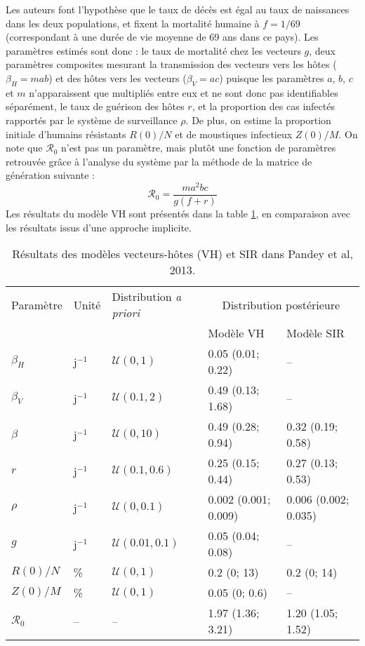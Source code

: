 Les auteurs font l'hypothèse que le taux de décès est égal au taux de naissances dans les deux populations, et fixent la mortalité humaine à $f=1/69$ (correspondant à une durée de vie moyenne de 69 ans dans ce pays).
Les paramètres estimés sont donc : le taux de mortalité chez les vecteurs $g$, deux paramètres composites mesurant la transmission des vecteurs vers les hôtes ($\beta_H=mab$) et des hôtes vers les vecteurs ($\beta_V=ac$) puisque les paramètres $a$, $b$, $c$ et $m$ n'apparaissent que multipliés entre eux et ne sont donc pas identifiables séparément, le taux de guérison des hôtes $r$, et la proportion des cas infectés rapportés par le système de surveillance $\rho$.
De plus, on estime la proportion initiale d'humains résistants $R(0)/N$ et de moustiques infectieux $Z(0)/M$.
On note que $\mathcal{R}_0$ n'est pas un paramètre, mais plutôt une fonction de paramètres retrouvée grâce à l'analyse du système par la méthode de la matrice de génération suivante :
\begin{equation}
\mathcal{R}_0 = \frac{ma^2bc}{g(f+r)}
\end{equation}
Les résultats du modèle VH sont présentés dans la table \ref{table:pandeyres}, en comparaison avec les résultats issus d'une approche implicite.

\begin{table}[h]
\centering
\caption{Résultats des modèles vecteurs-hôtes (VH) et SIR dans Pandey et al, 2013. \vspace{.5em}}
\label{table:pandeyres}
\begin{tabular}{lllll}
\hline 
Paramètre & Unité & Distribution {\em a priori} &\multicolumn{2}{c}{Distribution postérieure}\\ 
&&& Modèle VH & Modèle SIR \\
\hline
$\beta_H$ 	& j$^{-1}$ & $\mathcal{U}(0,1)$ 		& 0.05 (0.01; 0.22) & -- \\
$\beta_V$ 	& j$^{-1}$ & $\mathcal{U}(0.1,2)$ 		& 0.49 (0.13; 1.68) & -- \\
$\beta$ 	& j$^{-1}$ & $\mathcal{U}(0,10)$ 		& 0.49 (0.28; 0.94) & 0.32 (0.19; 0.58) \\
$r$ 		& j$^{-1}$ & $\mathcal{U}(0.1,0.6)$ 		& 0.25 (0.15; 0.44) & 0.27 (0.13; 0.53)\\
$\rho$ 		& j$^{-1}$ & $\mathcal{U}(0,0.1)$ 		& 0.002 (0.001; 0.009) & 0.006 (0.002; 0.035) \\
$g$ 		& j$^{-1}$ & $\mathcal{U}(0.01,0.1)$ 		& 0.05 (0.04; 0.08) & -- \\
$R(0)/N$ 	& \% & $\mathcal{U}(0,1)$ 		& 0.2 (0; 13) & 0.2 (0; 14)\\
$Z(0)/M$ 	& \% & $\mathcal{U}(0,1)$ 		& 0.05 (0; 0.6) & -- \\
$\mathcal{R}_0$ & -- & --		 		& 1.97 (1.36; 3.21) & 1.20 (1.05; 1.52)\\
\hline 
\end{tabular} 
\end{table}







